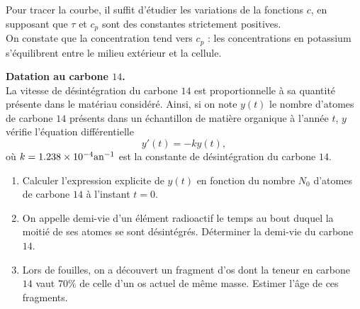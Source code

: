 \documentclass[a4paper, 11pt,reqno]{article}
\begin{document}
\begin{correction}
\begin{center}
    \hspace*{0.5cm} \begin{minipage}[c]{0.95\linewidth}
      Pour tracer la courbe, il suffit d'\'etudier les variations de la fonctions $c$, en supposant que $\tau$ et $c_p$ sont des constantes strictement positives.\\
      On constate que la concentration tend vers $c_p$ : les concentrations en potassium s'\'equilibrent entre le milieu ext\'erieur et la cellule.
    \end{minipage}
  \end{center}


\end{correction}

\begin{exercice}  \; \textbf{Datation au carbone $14$.}\\
  La vitesse de d\'esint\'egration du carbone $14$ est proportionnelle \`a sa quantit\'e pr\'esente dans le mat\'eriau consid\'er\'e. Ainsi, si on note $y(t)$ le nombre d'atomes de carbone $14$ pr\'esents dans un \'echantillon de mati\`ere organique \`a l'ann\'ee $t$, $y$ v\'erifie l'\'equation diff\'erentielle
  $$y'(t) = -k y(t),$$
  o\`u $k=1.238 \times 10^{-4} \textmd{an}^{-1}$ est la constante de d\'esint\'egration du carbone $14$.
  \begin{enumerate}
    \item Calculer l'expression explicite de $y(t)$ en fonction du nombre $N_0$ d'atomes de carbone $14$ \`a l'instant $t=0$.
    \item On appelle demi-vie d'un \'el\'ement radioactif le temps au bout duquel la moiti\'e de ses atomes se sont d\'esint\'egr\'es. D\'eterminer la demi-vie du carbone $14$.
    \item Lors de fouilles, on a d\'ecouvert un fragment d'os dont la teneur en carbone $14$ vaut $70\%$ de celle d'un os actuel de m\^eme masse. Estimer l'\^age de ces fragments.
  \end{enumerate}
\end{exercice}
\end{document}

